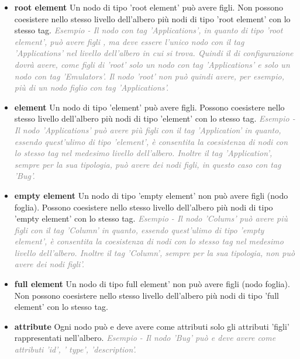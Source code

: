 \begin{itemize} [nosep]	
		\item \textbf{root element}  \newline
		Un nodo di tipo 'root element' può avere figli. Non possono coesistere nello stesso livello dell'albero più nodi di tipo 'root element' con lo stesso tag. \newline
		\textcolor{gray}{\emph{Esempio - Il nodo con tag 'Applications', in quanto di tipo 'root element', può avere figli , ma deve essere l'unico nodo con il tag 'Applications' nel livello dell'albero in cui si trova. Quindi il di configurazione dovrà avere, come figli di 'root' solo un nodo con tag 'Applications' e solo un nodo con tag 'Emulators'. Il nodo 'root' non può quindi avere, per esempio, più di un nodo figlio con tag 'Applications'.}}
		\item \textbf{element}  \newline
		Un nodo di tipo 'element' può avere figli. Possono coesistere nello stesso livello dell'albero più nodi di tipo 'element' con lo stesso tag. \newline
		\textcolor{gray}{\emph{Esempio - Il nodo 'Applications' può avere più figli con il tag 'Application' in quanto, essendo quest'ulimo di tipo 'element', è consentita la coesistenza di nodi con lo stesso tag nel medesimo livello dell'albero. Inoltre il tag 'Application', sempre per la sua tipologia, può avere dei nodi figli, in questo caso con tag 'Bug'.}}
		\item \textbf{empty element}  \newline
		Un nodo di tipo 'empty element' non può avere figli (nodo foglia). Possono coesistere nello stesso livello dell'albero più nodi di tipo 'empty element' con lo stesso tag. \newline
			\textcolor{gray}{\emph{Esempio - Il nodo 'Colums' può avere più figli con il tag 'Column' in quanto, essendo quest'ulimo di tipo 'empty element', è consentita la coesistenza di nodi con lo stesso tag nel medesimo livello dell'albero. Inoltre il tag 'Column', sempre per la sua tipologia, non può avere dei nodi figli'.}}
			\item \textbf{full element}  \newline
		Un nodo di tipo full element' non può avere figli (nodo foglia). Non possono coesistere nello stesso livello dell'albero più nodi di tipo 'full element' con lo stesso tag.
		\item \textbf{attribute}  \newline
		Ogni nodo può e deve avere come attributi solo gli attributi 'figli' rappresentati nell'albero. \newline
		\textcolor{gray}{\emph{Esempio - Il nodo 'Bug' può e deve avere come attributi 'id', ' type', 'description'.}}
\end{itemize}



